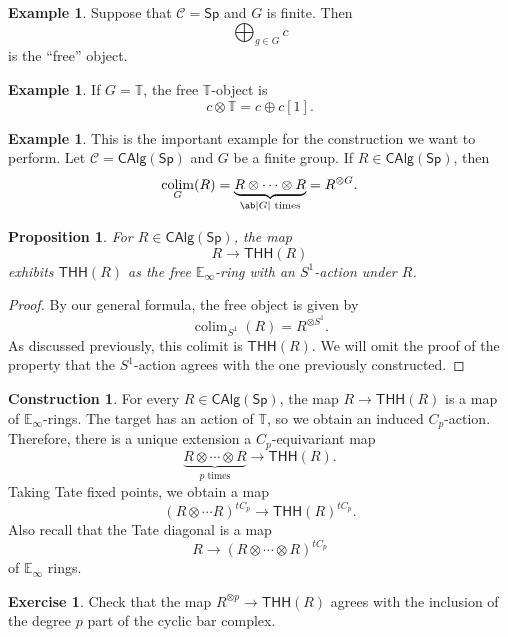 \documentclass[10pt, oneside]{memoir}
\newtheorem{prop}[thm]{Proposition}
\theoremstyle{definition}
\newtheorem{con}[thm]{Construction}
\newtheorem{exm}[thm]{Example}
\newtheorem{exer}[thm]{Exercise}
\theoremstyle{remark}
\theoremstyle{plain}
\theoremstyle{definition}
\theoremstyle{remark}
\newcommand{\E}{\mathbb{E}}
\newcommand{\mc}[1]{\mathcal{#1}}
\newcommand{\T}{\mathbb{T}}
\newcommand{\ms}[1]{\mathsf{#1}}
\newcommand{\1}{\mathbf{1}}
\newcommand{\2}{\mathbf{2}}
\newcommand{\3}{\mathbf{3}}
\newcommand{\THH}{\ms{THH}}
\DeclareMathOperator*{\colim}{colim}
\begin{document}
\begin{exm}
    Suppose that \(\mc{C} = \ms{Sp} \) and \(G \) is finite. Then 
    \[ \bigoplus_{g \in G} c \]
    is the ``free'' object.
\end{exm}

\begin{exm}
    If \(G = \T \), the free \(\T \)-object is
    \[ c \otimes \T = c \oplus c[1]. \]
\end{exm}

\begin{exm}
    This is the important example for the construction we want to perform. Let \(\mc{C} = \ms{CAlg}(\ms{Sp}) \) and \(G \) be a finite group. If \(R \in \ms{CAlg}(\ms{Sp}) \), then
    \[ \colim_G(R) = \underbrace{R \otimes \cdots \otimes R}_{\ab|G|\text{ times}} = R^{\otimes G}. \]
\end{exm}

\begin{prop}
    For \(R \in \ms{CAlg}(\ms{Sp}) \), the map
    \[ R \to \THH(R) \]
    exhibits \(\THH(R) \) as the free \(\E_{\infty} \)-ring with an \(S^1 \)-action under \(R \).
\end{prop}

\begin{proof}
    By our general formula, the free object is given by
    \[ \colim_{S^1} (R) = R^{\otimes S^1}. \]
    As discussed previously, this colimit is \(\THH(R) \). We will omit the proof of the property that the \(S^1 \)-action agrees with the one previously constructed.
\end{proof}

\begin{con}
    For every \(R \in \ms{CAlg}(\ms{Sp}) \), the map \(R \to \THH(R) \) is a map of \(\E_{\infty} \)-rings. The target has an action of \(\T \), so we obtain an induced \(C_p \)-action. Therefore, there is a unique extension a \(C_p \)-equivariant map
    \[ \underbrace{R \otimes \cdots \otimes R}_{p \text{ times}} \to \THH(R). \]
    Taking Tate fixed points, we obtain a map
    \[ (R \otimes \cdots R)^{t C_p} \to \THH(R)^{t C_p}. \]
    Also recall that the Tate diagonal is a map
    \[ R \to (R \otimes \cdots \otimes R)^{t C_p} \]
    of \(\E_{\infty} \) rings.
\end{con}

\begin{exer}
    Check that the map \(R^{\otimes p} \to \THH(R) \) agrees with the inclusion of the degree \(p \) part of the cyclic bar complex.
\end{exer}
\end{document}
